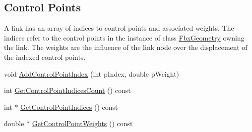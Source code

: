 \subsection*{Control Points}
\label{_amgrpdec32a6075e91e27f43e6aeeb36c8944}%
A link has an array of indices to control points and associated weights. The indices refer to the control points in the instance of class \hyperlink{class_fbx_geometry}{Fbx\+Geometry} owning the link. The weights are the influence of the link node over the displacement of the indexed control points. \begin{DoxyCompactItemize}
\item 
void \hyperlink{class_fbx_cluster_a877236816286cd8c5dcfa349ece9bee0}{Add\+Control\+Point\+Index} (int p\+Index, double p\+Weight)
\item 
int \hyperlink{class_fbx_cluster_a93949165294ced9468d5a848171602f9}{Get\+Control\+Point\+Indices\+Count} () const
\item 
int $\ast$ \hyperlink{class_fbx_cluster_a02f2bebebf9d32a81540921990a071b4}{Get\+Control\+Point\+Indices} () const
\item 
double $\ast$ \hyperlink{class_fbx_cluster_a5d42ec34a7b76844170492a3caaa1171}{Get\+Control\+Point\+Weights} () const
\end{DoxyCompactItemize}
